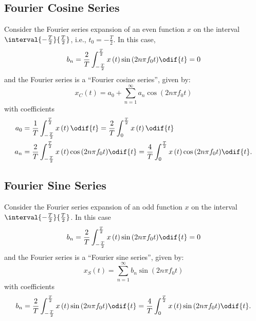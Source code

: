 \documentclass{article}
\begin{document}
\subsection{Fourier Cosine Series}
Consider the Fourier series expansion of an even function \(x\) on the interval \(\interval{-\frac{T}{2}}{\frac{T}{2}}\), i.e., \(t_0 = -\frac{T}{2}\).
In this case,
\begin{equation*}
    b_n = \frac{2}{T} \int_{-\frac{T}{2}}^{\frac{T}{2}} x\left( t \right) \sin{\left( 2n \pi f_0 t \right)} \odif{t} = 0
\end{equation*}
and the Fourier series is a ``Fourier cosine series'', given by:
\begin{equation*}
    x_C\left( t \right) = a_0 + \sum_{n = 1}^\infty a_n \cos{\left( 2n \pi f_0 t \right)}
\end{equation*}
with coefficients
\begin{align*}
    a_0 & = \frac{1}{T} \int_{-\frac{T}{2}}^{\frac{T}{2}} x\left( t \right) \odif{t}                                    = \frac{2}{T} \int_0^{\frac{T}{2}} x\left( t \right) \odif{t}                                    \\
    a_n & = \frac{2}{T} \int_{-\frac{T}{2}}^{\frac{T}{2}} x\left( t \right) \cos{\left( 2 n \pi f_0 t \right)} \odif{t} = \frac{4}{T} \int_0^{\frac{T}{2}} x\left( t \right) \cos{\left( 2n \pi f_0 t \right)} \odif{t}.
\end{align*}
\subsection{Fourier Sine Series}
Consider the Fourier series expansion of an odd function \(x\) on the interval \(\interval{-\frac{T}{2}}{\frac{T}{2}}\).
In this case
\begin{equation*}
    b_n = \frac{2}{T} \int_{-\frac{T}{2}}^{\frac{T}{2}} x\left( t \right) \sin{\left( 2n \pi f_0 t \right)} \odif{t} = 0
\end{equation*}
and the Fourier series is a ``Fourier sine series'', given by:
\begin{equation*}
    x_S\left( t \right) = \sum_{n = 1}^\infty b_n \sin{\left( 2n \pi f_0 t \right)}
\end{equation*}
with coefficients
\begin{equation*}
    b_n = \frac{2}{T} \int_{-\frac{T}{2}}^{\frac{T}{2}} x\left( t \right) \sin{\left( 2 n \pi f_0 t \right)} \odif{t} = \frac{4}{T} \int_0^{\frac{T}{2}} x\left( t \right) \sin{\left( 2n \pi f_0 t \right)} \odif{t}.
\end{equation*}
\end{document}

